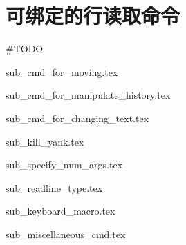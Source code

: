 \section{可绑定的行读取命令}

\#TODO

{sub_cmd_for_moving.tex}

{sub_cmd_for_manipulate_history.tex}

{sub_cmd_for_changing_text.tex}

{sub_kill_yank.tex}

{sub_specify_num_args.tex}

{sub_readline_type.tex}

{sub_keyboard_macro.tex}

{sub_miscellaneous_cmd.tex}
